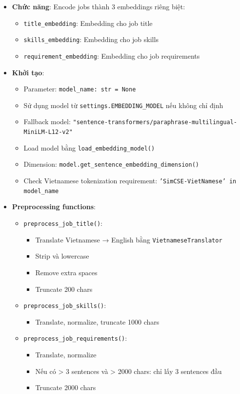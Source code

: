 \begin{itemize}
    \item \textbf{Chức năng}: Encode jobs thành 3 embeddings riêng biệt:
    \begin{itemize}
        \item \texttt{title\_embedding}: Embedding cho job title
        \item \texttt{skills\_embedding}: Embedding cho job skills
        \item \texttt{requirement\_embedding}: Embedding cho job requirements
    \end{itemize}
    
    \item \textbf{Khởi tạo}:
    \begin{itemize}
        \item Parameter: \texttt{model\_name: str = None}
        \item Sử dụng model từ \texttt{settings.EMBEDDING\_MODEL} nếu không chỉ định
        \item Fallback model: \texttt{"sentence-transformers/paraphrase-multilingual-MiniLM-L12-v2"}
        \item Load model bằng \texttt{load\_embedding\_model()}
        \item Dimension: \texttt{model.get\_sentence\_embedding\_dimension()}
        \item Check Vietnamese tokenization requirement: \texttt{'SimCSE-VietNamese' in model\_name}
    \end{itemize}
    
    \item \textbf{Preprocessing functions}:
    \begin{itemize}
        \item \texttt{preprocess\_job\_title()}: 
        \begin{itemize}
            \item Translate Vietnamese → English bằng \texttt{VietnameseTranslator}
            \item Strip và lowercase
            \item Remove extra spaces
            \item Truncate 200 chars
        \end{itemize}
        \item \texttt{preprocess\_job\_skills()}: 
        \begin{itemize}
            \item Translate, normalize, truncate 1000 chars
        \end{itemize}
        \item \texttt{preprocess\_job\_requirements()}: 
        \begin{itemize}
            \item Translate, normalize
            \item Nếu có > 3 sentences và > 2000 chars: chỉ lấy 3 sentences đầu
            \item Truncate 2000 chars
        \end{itemize}
    \end{itemize}
    

\end{itemize}
